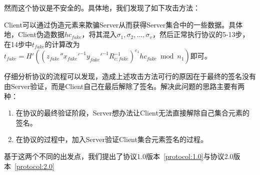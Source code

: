 然而这个协议是不安全的。具体地，我们发现了如下攻击方法：
\begin{proposition}\label{pro:attack}
Client可以通过伪造元素来欺骗Server从而获得Server集合中的一些数据。具体地，Client伪造数据$hc_{fake}$，将其混入$\sigma_1,\sigma_2,\dots,\sigma_v$，然后正常执行协议的5-13步，在14步中$t_{fake}$的计算改为$t_{fake}=H'((z_{fake}''x_{fake}'^{-1}y_{fake}'^{-1}R_{c:fake}^{-1})^{e_1}hc_{fake}\bmod{n_1})$即可。
\end{proposition}
\begin{remark}
仔细分析协议的流程可以发现，造成上述攻击方法可行的原因在于最终的签名没有由Server验证，而是Client自己在最后解除了签名。解决此问题的思路主要有两种：
\begin{enumerate}
\item 在协议的最终验证阶段，Server想办法让Client无法直接解除自己集合元素的签名。
\item 在协议的过程中，加入Server验证Client集合元素签名的过程。
\end{enumerate}
基于这两个不同的出发点，我们提出了协议1.0版本~\ref{protocol:1.0}与协议2.0版本~\ref{protocol:2.0}
\end{remark}

\newpage

